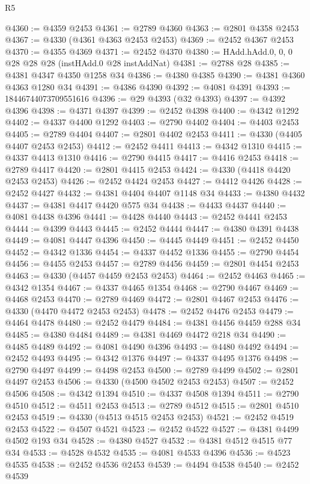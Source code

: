 \begin{lexlean}{R5}
\begin{coremodule}
@4360 := @4359 @2453
@4361 := @2789 @4360
@4363 := @2801 @4358 @2453
@4367 := @4330 (@4361 @4363 @2453 @2453)
@4369 := @2452 @4367 @2453
@4370 := @4355 @4369
@4371 := @2452 @4370
@4380 := HAdd.hAdd.{0, 0, 0} @28 @28 @28 (instHAdd.{0} @28 instAddNat)
@4381 := @2788 @28
@4385 := @4381 @4347 @4350 @1258 @34
@4386 := @4380 @4385
@4390 := @4381 @4360 @4363 @1280 @34
@4391 := @4386 @4390
@4392 := @4081 @4391
@4393 := 18446744073709551616
@4396 := @29 @4393 (@32 @4393)
@4397 := @4392 @4396
@4398 := @4371 @4397
@4399 := @2452 @4398
@4400 := @4342 @1292
@4402 := @4337 @4400 @1292
@4403 := @2790 @4402
@4404 := @4403 @2453
@4405 := @2789 @4404
@4407 := @2801 @4402 @2453
@4411 := @4330 (@4405 @4407 @2453 @2453)
@4412 := @2452 @4411
@4413 := @4342 @1310
@4415 := @4337 @4413 @1310
@4416 := @2790 @4415
@4417 := @4416 @2453
@4418 := @2789 @4417
@4420 := @2801 @4415 @2453
@4424 := @4330 (@4418 @4420 @2453 @2453)
@4426 := @2452 @4424 @2453
@4427 := @4412 @4426
@4428 := @2452 @4427
@4432 := @4381 @4404 @4407 @1148 @34
@4433 := @4380 @4432
@4437 := @4381 @4417 @4420 @575 @34
@4438 := @4433 @4437
@4440 := @4081 @4438 @4396
@4441 := @4428 @4440
@4443 := @2452 @4441 @2453
@4444 := @4399 @4443
@4445 := @2452 @4444
@4447 := @4380 @4391 @4438
@4449 := @4081 @4447 @4396
@4450 := @4445 @4449
@4451 := @2452 @4450
@4452 := @4342 @1336
@4454 := @4337 @4452 @1336
@4455 := @2790 @4454
@4456 := @4455 @2453
@4457 := @2789 @4456
@4459 := @2801 @4454 @2453
@4463 := @4330 (@4457 @4459 @2453 @2453)
@4464 := @2452 @4463
@4465 := @4342 @1354
@4467 := @4337 @4465 @1354
@4468 := @2790 @4467
@4469 := @4468 @2453
@4470 := @2789 @4469
@4472 := @2801 @4467 @2453
@4476 := @4330 (@4470 @4472 @2453 @2453)
@4478 := @2452 @4476 @2453
@4479 := @4464 @4478
@4480 := @2452 @4479
@4484 := @4381 @4456 @4459 @288 @34
@4485 := @4380 @4484
@4489 := @4381 @4469 @4472 @218 @34
@4490 := @4485 @4489
@4492 := @4081 @4490 @4396
@4493 := @4480 @4492
@4494 := @2452 @4493
@4495 := @4342 @1376
@4497 := @4337 @4495 @1376
@4498 := @2790 @4497
@4499 := @4498 @2453
@4500 := @2789 @4499
@4502 := @2801 @4497 @2453
@4506 := @4330 (@4500 @4502 @2453 @2453)
@4507 := @2452 @4506
@4508 := @4342 @1394
@4510 := @4337 @4508 @1394
@4511 := @2790 @4510
@4512 := @4511 @2453
@4513 := @2789 @4512
@4515 := @2801 @4510 @2453
@4519 := @4330 (@4513 @4515 @2453 @2453)
@4521 := @2452 @4519 @2453
@4522 := @4507 @4521
@4523 := @2452 @4522
@4527 := @4381 @4499 @4502 @193 @34
@4528 := @4380 @4527
@4532 := @4381 @4512 @4515 @77 @34
@4533 := @4528 @4532
@4535 := @4081 @4533 @4396
@4536 := @4523 @4535
@4538 := @2452 @4536 @2453
@4539 := @4494 @4538
@4540 := @2452 @4539

\end{coremodule}
\end{lexlean}
